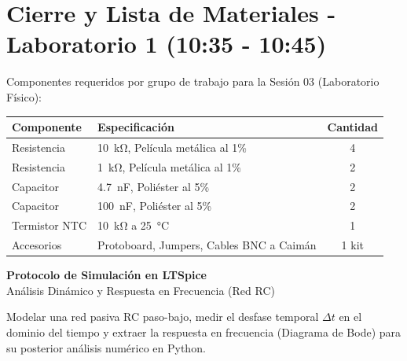 \documentclass[11pt,a4paper]{article}
\begin{document}
\section{Cierre y Lista de Materiales - Laboratorio 1 (10:35 - 10:45)}
Componentes requeridos por grupo de trabajo para la Sesión 03 (Laboratorio Físico):
\begin{table}[h!]
    \centering
    \begin{tabular}{@{}llc@{}}
        \toprule
        \textbf{Componente} & \textbf{Especificación} & \textbf{Cantidad} \\
        \midrule
        Resistencia & \qty{10}{\kilo\ohm}, Película metálica al 1\% & 4 \\
        Resistencia & \qty{1}{\kilo\ohm}, Película metálica al 1\% & 2 \\
        Capacitor & \qty{4.7}{\nano\farad}, Poliéster al 5\% & 2 \\
        Capacitor & \qty{100}{\nano\farad}, Poliéster al 5\% & 2 \\
        Termistor NTC & \qty{10}{\kilo\ohm} a \qty{25}{\celsius} & 1 \\
        Accesorios & Protoboard, Jumpers, Cables BNC a Caimán & 1 kit \\
        \bottomrule
    \end{tabular}
\end{table}

\newpage
\fancyhf{} 
\chead{\textcolor{gray}{Protocolo de Simulación}}

\begin{center}
    \Large\textbf{Protocolo de Simulación en LTSpice}\\
    \large Análisis Dinámico y Respuesta en Frecuencia (Red RC)
\end{center}
\vspace{0.3cm}

\begin{tcolorbox}[colback=gray!5, colframe=gray!60!black, title=\textbf{Objetivo del Protocolo}]
Modelar una red pasiva RC paso-bajo, medir el desfase temporal $\Delta t$ en el dominio del tiempo y extraer la respuesta en frecuencia (Diagrama de Bode) para su posterior análisis numérico en Python.
\end{tcolorbox}
\end{document}
